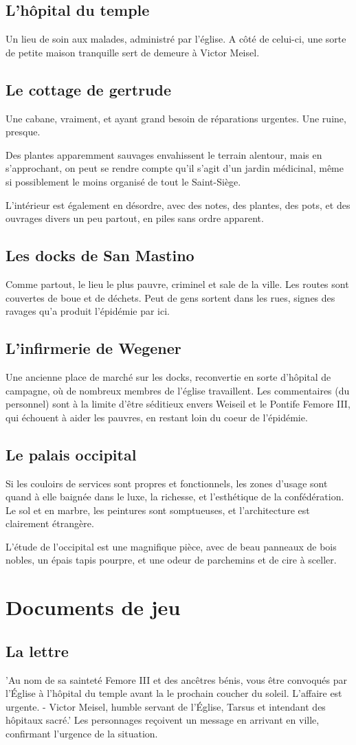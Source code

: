 \documentclass[10pt,a4paper]{article}
\begin{document}
\subsection{L'hôpital du temple}
Un lieu de soin aux malades, administré par l'église. A côté de celui-ci, une sorte de petite maison tranquille sert de demeure à Victor Meisel.
\subsection{Le cottage de gertrude}
Une cabane, vraiment, et ayant grand besoin de réparations urgentes. Une ruine, presque. 

Des plantes apparemment sauvages envahissent le terrain alentour, mais en s'approchant, on peut se rendre compte qu'il s'agit d'un jardin médicinal, même si possiblement le moins organisé de tout le Saint-Siège.

L'intérieur est également en désordre, avec des notes, des plantes, des pots, et des ouvrages divers un peu partout, en piles sans ordre apparent.
\subsection{Les docks de San Mastino}
Comme partout, le lieu le plus pauvre, criminel et sale de la ville. Les routes sont couvertes de boue et de déchets. Peut de gens sortent dans les rues, signes des ravages qu'a produit l'épidémie par ici.
\subsection{L'infirmerie de Wegener}
Une ancienne place de marché sur les docks, reconvertie en sorte d'hôpital de campagne, où de nombreux membres de l'église travaillent. Les commentaires (du personnel) sont à la limite d'être séditieux envers Weiseil et le Pontife Femore III, qui échouent à aider les pauvres, en restant loin du coeur de l'épidémie.
\subsection{Le palais occipital}
Si les couloirs de services sont propres et fonctionnels, les zones d'usage sont quand à elle baignée dans le luxe, la richesse, et l'esthétique de la confédération.  Le sol et en marbre, les peintures sont somptueuses, et l'architecture est clairement étrangère.

L'étude de l'occipital est une magnifique pièce, avec de beau panneaux de bois nobles, un épais tapis pourpre, et une odeur de parchemins et de cire à sceller.
\section{Documents de jeu}
\subsection{La lettre}
'Au nom de sa sainteté Femore III et des ancêtres bénis, vous être convoqués par l'Église à l'hôpital du temple avant la le prochain coucher du soleil. L'affaire est urgente. - Victor Meisel, humble servant de l'Église, Tarsus et intendant des hôpitaux sacré.'
Les personnages reçoivent un message en arrivant en ville, confirmant l'urgence de la situation.
\end{document}
